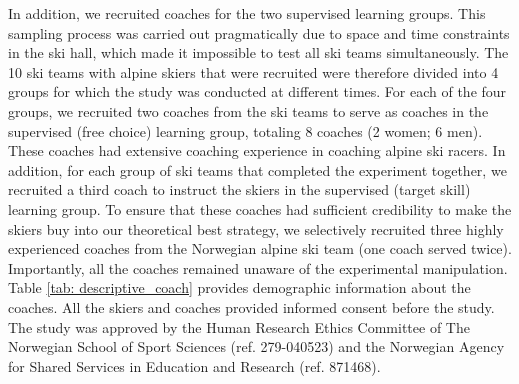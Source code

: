 \documentclass[pdflatex,sn-nature]{sn-jnl}%
\theoremstyle{thmstyleone}%
\theoremstyle{thmstyletwo}%
\theoremstyle{thmstylethree}%
\begin{document}
In addition, we recruited coaches for the two supervised learning groups. This sampling process was carried out pragmatically due to space and time constraints in the ski hall, which made it impossible to test all ski teams simultaneously. The 10 ski teams with alpine skiers that were recruited were therefore divided into 4 groups for which the study was conducted at different times. For each of the four groups, we recruited two coaches from the ski teams to serve as coaches in the supervised (free choice) learning group, totaling 8 coaches (2 women; 6 men). These coaches had extensive coaching experience in coaching alpine ski racers. In addition, for each group of ski teams that completed the experiment together, we recruited a third coach to instruct the skiers in the supervised (target skill) learning group. To ensure that these coaches had sufficient credibility to make the skiers buy into our theoretical best strategy, we selectively recruited three highly experienced coaches from the Norwegian alpine ski team (one coach served twice). Importantly, all the coaches remained unaware of the experimental manipulation. Table \ref{tab: descriptive_coach} provides demographic information about the coaches. All the skiers and coaches provided informed consent before the study. The study was approved by the Human Research Ethics Committee of The Norwegian School of Sport Sciences (ref. 279-040523) and the Norwegian Agency for Shared Services in Education and Research (ref. 871468).
\end{document}
